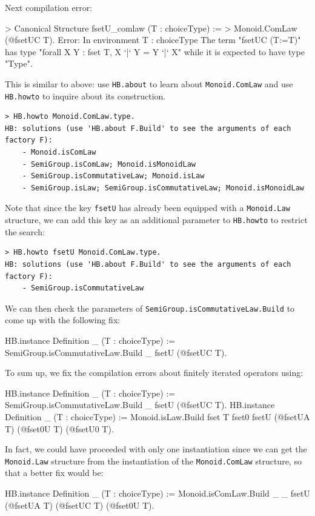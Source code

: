\documentclass{article}
\def\coqin#1{\texttt{#1}}
\begin{document}
\bigskip

Next compilation error:
\begin{failure}
> Canonical Structure fsetU_comlaw (T : choiceType) := 
>   Monoid.ComLaw (@fsetUC T).
Error:
In environment
T : choiceType
The term "fsetUC (T:=T)" has type "forall X Y : {fset T}, X `|` Y = Y `|` X"
  while it is expected to have type "Type".  
\end{failure}
This is similar to above: use \coqin{HB.about} to learn about
\coqin{Monoid.ComLaw} and use \coqin{HB.howto} to inquire about its construction.
\begin{verbatim}
> HB.howto Monoid.ComLaw.type.
HB: solutions (use 'HB.about F.Build' to see the arguments of each factory F):
    - Monoid.isComLaw
    - SemiGroup.isComLaw; Monoid.isMonoidLaw
    - SemiGroup.isCommutativeLaw; Monoid.isLaw
    - SemiGroup.isLaw; SemiGroup.isCommutativeLaw; Monoid.isMonoidLaw
\end{verbatim}
Note that since the key \coqin{fsetU} has already been equipped with a \coqin{Monoid.Law} structure,
we can add this key as an additional parameter to \coqin{HB.howto} to restrict the search:
\begin{verbatim}
> HB.howto fsetU Monoid.ComLaw.type.
HB: solutions (use 'HB.about F.Build' to see the arguments of each factory F):
    - SemiGroup.isCommutativeLaw
\end{verbatim}
We can then check the parameters of \coqin{SemiGroup.isCommutativeLaw.Build} to come up with the following fix:
\begin{success}
HB.instance Definition _ (T : choiceType) :=
  SemiGroup.isCommutativeLaw.Build _ fsetU (@fsetUC T).
\end{success}

To sum up, we fix the compilation errors about finitely iterated operators using:
\begin{success}
HB.instance Definition _ (T : choiceType) :=
  SemiGroup.isCommutativeLaw.Build _ fsetU (@fsetUC T).
HB.instance Definition _ (T : choiceType) := 
  Monoid.isLaw.Build {fset T} fset0 fsetU (@fsetUA T) (@fset0U T) (@fsetU0 T).  
\end{success}
In fact, we could have proceeded with only one instantiation since
we can get the \coqin{Monoid.Law} structure from the instantiation of the 
\coqin{Monoid.ComLaw} structure, so that a better fix would be:
\begin{success}
HB.instance Definition _ (T : choiceType) :=
  Monoid.isComLaw.Build _ _ fsetU (@fsetUA T) (@fsetUC T) (@fset0U T).
\end{success}
\end{document}
